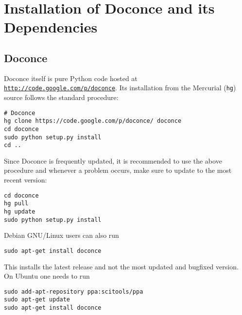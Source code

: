 \documentclass[%
oneside,                 %
final,                   %
10pt]{article}
\begin{document}
\section{Installation of Doconce and its Dependencies}

\subsection{Doconce}

Doconce itself is pure Python code hosted at \href{{http://code.google.com/p/doconce}}{\nolinkurl{http://code.google.com/p/doconce}}.  Its installation from the
Mercurial ({\fontsize{10pt}{10pt}\Verb!hg!}) source follows the standard procedure:
\vspace{4pt}
\begin{Verbatim}[numbers=none,frame=lines,label=\fbox{{\tiny Terminal}},fontsize=\fontsize{9pt}{9pt},
labelposition=topline,framesep=2.5mm,framerule=0.7pt]
# Doconce
hg clone https://code.google.com/p/doconce/ doconce
cd doconce
sudo python setup.py install
cd ..
\end{Verbatim}
Since Doconce is frequently updated, it is recommended to use the
above procedure and whenever a problem occurs, make sure to
update to the most recent version:
\vspace{4pt}
\begin{Verbatim}[numbers=none,frame=lines,label=\fbox{{\tiny Terminal}},fontsize=\fontsize{9pt}{9pt},
labelposition=topline,framesep=2.5mm,framerule=0.7pt]
cd doconce
hg pull
hg update
sudo python setup.py install
\end{Verbatim}

Debian GNU/Linux users can also run
\vspace{4pt}
\begin{Verbatim}[numbers=none,frame=lines,label=\fbox{{\tiny Terminal}},fontsize=\fontsize{9pt}{9pt},
labelposition=topline,framesep=2.5mm,framerule=0.7pt]
sudo apt-get install doconce
\end{Verbatim}
This installs the latest release and not the most updated and bugfixed
version.
On Ubuntu one needs to run
\vspace{4pt}
\begin{Verbatim}[numbers=none,frame=lines,label=\fbox{{\tiny Terminal}},fontsize=\fontsize{9pt}{9pt},
labelposition=topline,framesep=2.5mm,framerule=0.7pt]
sudo add-apt-repository ppa:scitools/ppa
sudo apt-get update
sudo apt-get install doconce
\end{Verbatim}
\end{document}

